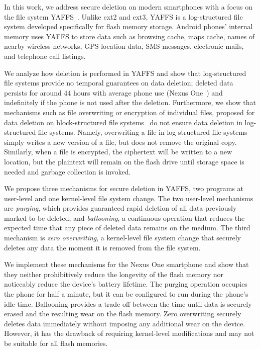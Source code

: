 \documentclass{acmtog}
\begin{document}
In this work, we address secure deletion on modern smartphones
with a focus on the file system YAFFS~\cite{yaffs}. 
Unlike ext2 and ext3, YAFFS is a log-structured file system developed
specifically for flash memory storage. Android phones' internal memory 
uses YAFFS to store data such as browsing cache, maps cache,
names of nearby wireless networks, GPS location data, SMS messages, electronic
mails, and telephone call listings. 

We analyze how deletion is
performed in YAFFS and show that log-structured file systems provide no
temporal guarantees on data deletion; deleted data persists
for around 44 hours with average phone use (Nexus
One~\cite{nexus}) and indefinitely if the phone is not used after the
deletion.  Furthermore, we show that mechanisms such as file
overwriting or encryption of individual files, proposed for data
deletion on block-structured file systems~\cite{shred,gpg} do
not ensure data deletion in log-structured file systems.
Namely, overwriting a file in log-structured file systems
simply writes a new version of a file, but does not remove  the
original copy. Similarly, when a file is encrypted, the ciphertext
will be written to a new location, but the plaintext will remain on
the flash drive until storage space is needed and garbage
collection is invoked. 

We propose three mechanisms for secure deletion
in YAFFS, two programs at user-level and one kernel-level file system change. 
The two user-level mechanisms are \emph{purging}, which
provides guaranteed rapid deletion of all data previously marked to be
deleted, and \emph{ballooning}, a continuous operation that reduces the
expected time that any piece of deleted data remains on the medium. The third mechanism is 
\emph{zero overwriting}, a kernel-level file system change that
securely deletes any data the moment it is removed from the file system.

We implement these mechanisms for the Nexus One smartphone and show that they
neither prohibitively 
reduce the longevity of the flash memory nor noticeably reduce the device's battery
lifetime. The purging operation occupies the phone
for half a minute, but it can be configured to
run during the phone's idle time. Ballooning provides a trade off between the time
until data is securely erased and the resulting wear on the flash memory. 
Zero overwriting securely deletes data immediately without imposing any
additional wear on the device. However, it has the drawback of requiring
kernel-level modifications and may not be suitable for all flash memories. 
\end{document}
